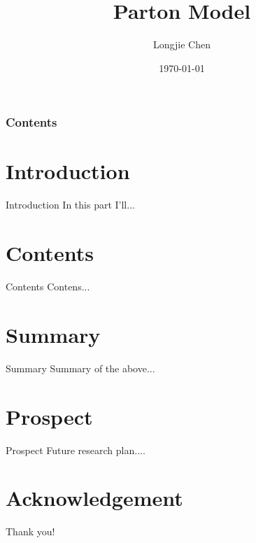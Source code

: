 \documentclass[10pt]{beamer}
\title[SCNU]{Parton Model}%
\author[Longjie Chen]{Longjie Chen}%
\institute[IQM]{South China
Normal University}%
\date[\textcolor{white}{\today} ]
{\today}%
\begin{document}
\frame{\titlepage}
\begin{frame}
\frametitle{Contents}
\tableofcontents
\end{frame}
\section{Introduction}
    \begin{frame}{Introduction}
 In this part I'll...
    \end{frame}



\section{Contents}
\begin{frame}{Contents}
	Contens...
\end{frame}



\section{Summary}
    \begin{frame}{Summary}
 Summary of the above...
    \end{frame}


\section{Prospect}
\begin{frame}{Prospect}
	Future research plan.... 
\end{frame}

\section*{Acknowledgement}  
\begin{frame}
\textcolor{myNewColorA}{\Huge{\centerline{Thank you!}}}
\end{frame}
\end{document}

